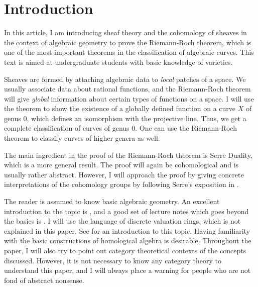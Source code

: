 \section*{Introduction}
In this article, I am introducing sheaf theory and the cohomology of
sheaves in the context of algebraic geometry to prove the Riemann-Roch 
theorem, which is one of the most important theorems in the classification
of algebraic curves. This text is aimed at undergraduate students with
basic knowledge of varieties.

Sheaves are formed by attaching algebraic data to \emph{local} patches of 
a space. We usually associate data about rational functions, and 
the Riemann-Roch theorem will give \emph{global} information about certain 
types of functions on a space. I will use the theorem to show the existence 
of a globally defined function on a curve $X$ of genus 0, which defines 
an isomorphism with the projective line. Thus, we get a complete 
classification of curves of genus 0. One can use the Riemann-Roch theorem 
to classify curves of higher genera as well.

The main ingredient in the proof of the Riemann-Roch theorem is Serre
Duality, which is a more general result. The proof will again
be cohomological and is usually rather abstract. However, I will
approach the proof by giving concrete interpretations of
the cohomology groups by following Serre's exposition in \cite{serre}.

The reader is assumed to know basic algebraic geometry. An excellent
introduction to the topic is \cite{reid}, and a good set of lecture notes
which goes beyond the basics is \cite{gathmann}. I will use the language
of discrete valuation rings, which is not explained in this paper. See
\cite{fulton} for an introduction to this topic. Having familiarity with 
the basic constructions of homological algebra is desirable. Throughout 
the paper, I will also try to point out category theoretical contexts of
the concepts discussed. However, it is not necessary to know any category
theory to understand this paper, and I will always place a warning for
people who are not fond of abstract nonsense.
